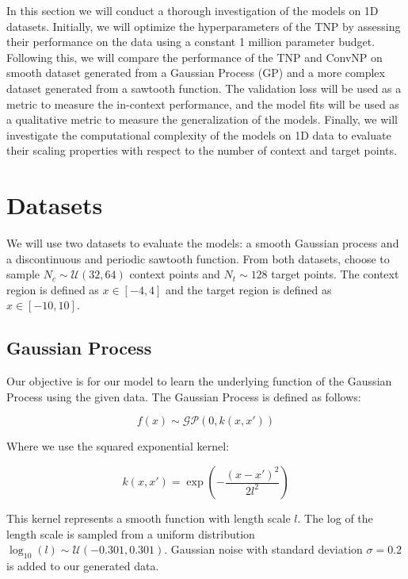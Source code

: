 \documentclass[../../main.tex]{subfiles}
\begin{document}
In this section we will conduct a thorough investigation of the models on 1D datasets. Initially, we will optimize the hyperparameters of the TNP by assessing their performance on the data using a constant 1 million parameter budget. Following this, we will compare the performance of the TNP and ConvNP on smooth dataset generated from a Gaussian Process (GP) \cite{books/lib/RasmussenW06} and a more complex dataset generated from a sawtooth function. The validation loss will be used as a metric to measure the in-context performance, and the model fits will be used as a qualitative metric to measure the generalization of the models. Finally, we will investigate the computational complexity of the models on 1D data to evaluate their scaling properties with respect to the number of context and target points.

\section{Datasets}

We will use two datasets to evaluate the models: a smooth Gaussian process and a discontinuous and periodic sawtooth function. From both datasets, choose to sample $N_c \sim \mathcal{U}(32, 64)$ context points and $N_t \sim 128$ target points. The context region is defined as $x \in [-4, 4]$ and the target region is defined as $x \in [-10, 10]$. 

\subsection{Gaussian Process}
\label{sec:1d-gp-dataset}

 Our objective is for our model to learn the underlying function of the Gaussian Process using the given data. The Gaussian Process is defined as follows:

\begin{equation}
	f(x) \sim \mathcal{GP}(0, k(x, x'))
\end{equation}

Where we use the squared exponential kernel:

\begin{equation}
	k(x, x') = \exp\left(-\frac{(x - x')^2}{2l^2}\right)
\end{equation}

This kernel represents a smooth function with length scale $l$. The log of the length scale is sampled from a uniform distribution $\log_{10}(l) \sim \mathcal{U}(-0.301, 0.301)$. Gaussian noise with standard deviation $\sigma = 0.2$ is added to our generated data. 
\end{document}
